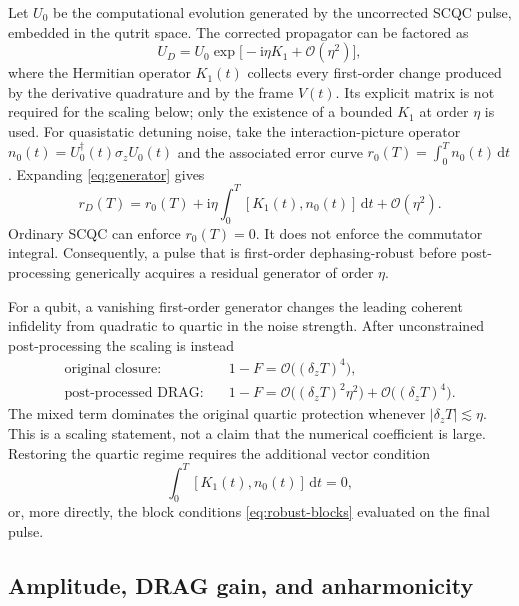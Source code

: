 \documentclass[11pt,a4paper]{article}
\theoremstyle{definition}
\newcommand{\abs}[1]{\lvert #1\rvert}
\newcommand{\dd}{\mathrm{d}}
\newcommand{\ii}{\mathrm{i}}
\newcommand{\order}{\mathcal{O}}
\begin{document}
Let \(U_0\) be the computational evolution generated by the uncorrected SCQC
pulse, embedded in the qutrit space.  The corrected propagator can be
factored as
\begin{equation}
  U_D=U_0\exp\bigl[-\ii\eta K_1+\order(\eta^2)\bigr],
\end{equation}
where the Hermitian operator \(K_1(t)\) collects every first-order change
produced by the derivative quadrature and by the frame \(V(t)\).  Its explicit
matrix is not required for the scaling below; only the existence of a bounded
\(K_1\) at order \(\eta\) is used.
For quasistatic detuning noise, take the interaction-picture operator
\(n_0(t)=U_0^\dagger(t)\sigma_z U_0(t)\) and the associated error curve
\(r_0(T)=\int_0^T n_0(t)\,\dd t\).  Expanding \eqref{eq:generator} gives
\begin{equation}
\label{eq:perturbed-curve}
  r_D(T)=r_0(T)+\ii\eta\int_0^T[K_1(t),n_0(t)]\,\dd t+\order(\eta^2).
\end{equation}
Ordinary SCQC can enforce \(r_0(T)=0\).  It does not enforce the commutator
integral.  Consequently, a pulse that is first-order dephasing-robust before
post-processing generically acquires a residual generator of order
\(\eta\).

For a qubit, a vanishing first-order generator changes the leading coherent
infidelity from quadratic to quartic in the noise strength.  After
unconstrained post-processing the scaling is instead
\begin{equation}
\label{eq:scaling-robust}
\begin{aligned}
  \text{original closure:}\quad
    &1-F=\order\bigl((\delta_zT)^4\bigr),\\
  \text{post-processed DRAG:}\quad
    &1-F=\order\bigl((\delta_zT)^2\eta^2\bigr)+\order\bigl((\delta_zT)^4\bigr).
\end{aligned}
\end{equation}
The mixed term dominates the original quartic protection whenever
\(\abs{\delta_zT}\lesssim\eta\).  This is a scaling statement, not a claim that
the numerical coefficient is large.  Restoring the quartic regime requires the
additional vector condition
\begin{equation}
\label{eq:mixed}
  \int_0^T[K_1(t),n_0(t)]\,\dd t=0,
\end{equation}
or, more directly, the block conditions \eqref{eq:robust-blocks} evaluated on
the final pulse.

\subsection{Amplitude, DRAG gain, and anharmonicity}
\end{document}
